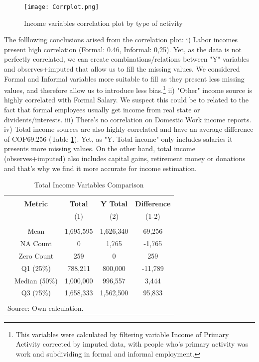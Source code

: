 \documentclass[a4paper,12pt]{article}
\begin{document}
\begin{figure}[H]
    \centering
    \caption{Income variables correlation plot by type of activity}
    \texttt{[image: Corrplot.png]}
    \label{fig:corrplot}
    \scriptsize %
\end{figure}

The folllowing conclusions arised from the correlation plot: i) Labor incomes  present high correlation (Formal: 0.46, Informal: 0,25). Yet, as the data is not perfectly correlated, we can create combinations/relations between "Y" variables and observes+imputed that allow us to fill the missing values. We considered Formal and Informal variables more suitable to fill as they present less missing values, and therefore allow us to introduce less bias.\footnote{This variables were calculated by filtering variable Income of Primary Activity corrected by imputed data, with people who's primary activity was work and subdividing in formal and informal employment.} ii) "Other" income source is highly correlated with Formal Salary. We suspect this could be to related to the fact that formal employees usually get income from real state or dividents/interests. iii) There's no correlation on Domestic Work income reports. iv) Total income sources are also highly correlated and have an average difference of COP69.256 (Table \ref{tab:total_income}). Yet, as "Y. Total income"  only includes salaries it presents more missing values. On the other hand, total income (observes+imputed) also includes capital gains, retirement money or donations and that's why we find it more accurate for income estimation.

\begin{table}[!htbp] 
    \centering 
    \caption{Total Income Variables Comparison} 
    \label{tab:total_income} 
    \begin{tabular}{@{\extracolsep{5pt}} ccccc} 
    \hline \hline \\[-1.8ex] 
     & \textbf{Metric} & \textbf{Total} & \textbf{Y Total} & \textbf{Difference} \\ 
     &  & (1) & (2) & (1-2) \\ 
    \hline \\[-1.8ex] 
     & Mean & 1,695,595 & 1,626,340 & 69,256 \\ 
     & NA Count & 0 & 1,765 & -1,765 \\ 
     & Zero Count & 259 & 0 & 259 \\ 
     & Q1 (25\%) & 788,211 & 800,000 & -11,789 \\ 
     & Median (50\%) & 1,000,000 & 996,557 & 3,444 \\ 
     & Q3 (75\%) & 1,658,333 & 1,562,500 & 95,833 \\ 
    \hline \\[-1.8ex] 
    \multicolumn{5}{l}{Source: Own calculation.} 
    \end{tabular} 
\end{table}
\end{document}
